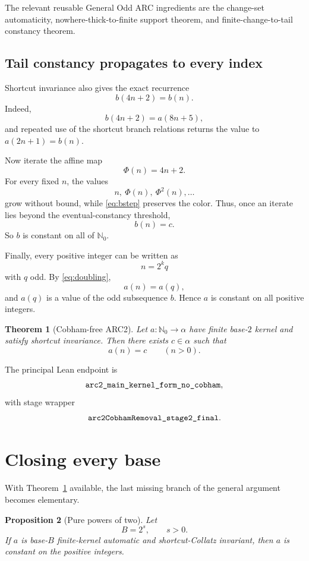 \documentclass[11pt]{article}
\newtheorem{theorem}{Theorem}[section]
\newtheorem{proposition}[theorem]{Proposition}
\theoremstyle{remark}
\newcommand{\Nzero}{\mathbb{N}_0}
\newcommand{\code}[1]{\texttt{\detokenize{#1}}}
\begin{document}
The relevant reusable General Odd ARC ingredients are the change-set
automaticity, nowhere-thick-to-finite support theorem, and finite-change-to-tail
constancy theorem.

\subsection{Tail constancy propagates to every index}

Shortcut invariance also gives the exact recurrence
\begin{equation}\label{eq:bstep}
b(4n+2)=b(n).
\end{equation}
Indeed,
\[
b(4n+2)
=
a(8n+5),
\]
and repeated use of the shortcut branch relations returns the value to
$a(2n+1)=b(n)$.

Now iterate the affine map
\[
\Phi(n)=4n+2.
\]
For every fixed $n$, the values
\[
n,\ \Phi(n),\ \Phi^2(n),\ldots
\]
grow without bound, while \eqref{eq:bstep} preserves the color.  Thus, once an
iterate lies beyond the eventual-constancy threshold,
\[
b(n)=c.
\]
So $b$ is constant on all of $\Nzero$.

Finally, every positive integer can be written as
\[
n=2^k q
\]
with $q$ odd.  By \eqref{eq:doubling},
\[
a(n)=a(q),
\]
and $a(q)$ is a value of the odd subsequence $b$.  Hence $a$ is constant on all
positive integers.

\begin{theorem}[Cobham-free ARC2]\label{thm:arc2}
Let $a:\Nzero\to\alpha$ have finite base-$2$ kernel and satisfy shortcut
invariance.  Then there exists $c\in\alpha$ such that
\[
a(n)=c\qquad(n>0).
\]
\end{theorem}

The principal Lean endpoint is
\[
\code{arc2_main_kernel_form_no_cobham},
\]
with stage wrapper
\[
\code{arc2CobhamRemoval_stage2_final}.
\]

\section{Closing every base}

With Theorem~\ref{thm:arc2} available, the last missing branch of the general
argument becomes elementary.

\begin{proposition}[Pure powers of two]\label{prop:pure}
Let
\[
B=2^s,\qquad s>0.
\]
If $a$ is base-$B$ finite-kernel automatic and shortcut-Collatz invariant,
then $a$ is constant on the positive integers.
\end{proposition}
\end{document}

